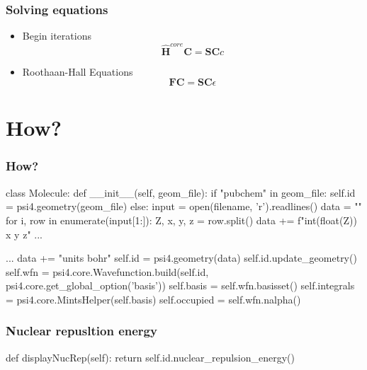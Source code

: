 \documentclass{beamer}
\begin{document}
\begin{frame}
    \frametitle{Solving equations}
    \begin{itemize}
        \item Begin iterations
        \begin{equation*}
            \boldsymbol{\hat{H}}^{core}\boldsymbol{C} = \boldsymbol{SC}c
        \end{equation*} 
        \item Roothaan-Hall Equations
        \begin{equation*}
            \boldsymbol{FC} = \boldsymbol{SC}\epsilon
        \end{equation*}
    \end{itemize}
\end{frame}

\section{How?}
\label{sec:how}
\begin{frame}[fragile]
    \frametitle{How?}
    \begin{python}
class Molecule:
    def __init__(self, geom_file):
        if "pubchem" in geom_file:
            self.id = psi4.geometry(geom_file)
        else:
            input = open(filename, 'r').readlines()
            data = ""
            for i, row in enumerate(input[1:]):
                Z, x, y, z = row.split()
                data += f"{int(float(Z))} {x} {y} {z}\n"
            ...       
    \end{python}
\end{frame}

\begin{frame}[fragile]
    \begin{python}
        ...
        data += "units bohr"
        self.id = psi4.geometry(data)
        self.id.update_geometry()
        self.wfn =  psi4.core.Wavefunction.build(self.id, psi4.core.get_global_option('basis'))
        self.basis = self.wfn.basisset()
        self.integrals = psi4.core.MintsHelper(self.basis)
        self.occupied = self.wfn.nalpha() 
    \end{python}  
\end{frame}


\begin{frame}[fragile]
    \frametitle{Nuclear repusltion energy}
    \begin{python}
def displayNucRep(self):
    return self.id.nuclear_repulsion_energy()
    \end{python}
\end{frame}
\end{document}

